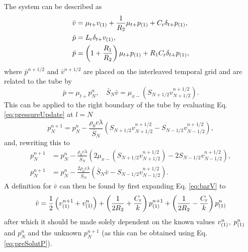 {The system can be described as
\begin{subequations}\label{eq:barVPSystem}
    \begin{align}
        \bar v &= \mu_{t+}v_{(1)} + \frac{1}{R_2}\mu_{t+}p_{(1)} + C_{\text{r}} \delta_{t+}p_{(1)},\label{eq:barV}\\
        \bar p &= L_{\text{r}} \delta_{t+}v_{(1)},\label{eq:barP1}\\
        \bar p &= \left(1+\frac{R_1}{R_2}\right)\mu_{t+}p_{(1)}+ R_1 C_{\text{r}}\delta_{t+}p_{(1)}\label{eq:barP2},
    \end{align}
\end{subequations}
where $\bar p^{n+1/2}$ and $\bar v^{n+1/2}$ are placed on the interleaved temporal grid and are related to the tube by
\begin{equation}\label{eq:barVars}
    \bar p = \mu_{t+}p^n_N, \quad \bar S_N \bar v = \mu_{x-}\left(S_{N+1/2}v_{N+1/2}^{n+1/2}\right).
\end{equation}
This can be applied to the right boundary of the tube by evaluating Eq. \eqref{eq:pressureUpdate} at $l = N$
\begin{equation}
    p_N^{n+1} = p_N^n - \frac{\rho_0 c \lambda}{\bar{S}_N}\left(S_{N+1/2}v_{N+1/2}^{n+1/2}-S_{N-1/2}v_{N-1/2}^{n+1/2}\right),
\end{equation}
and, rewriting this to 
\begin{align}
    p_N^{n+1} &= p_N^n - \frac{\rho_0 c \lambda}{\bar{S}_N}\left(2\mu_{x-}\left(S_{N+1/2}v_{N+1/2}^{n+1/2}\right)-2S_{N-1/2}v_{N-1/2}^{n+1/2}\right)\nonumber,\\
    p_N^{n+1} &= p_N^n - \frac{2\rho_0 c \lambda}{\bar{S}_N}\left(\bar S_N \bar v-S_{N-1/2}v_{N-1/2}^{n+1/2}\right)\label{eq:preSolutP}.
\end{align}
A definition for $\bar v$ can then be found by first expanding Eq. \eqref{eq:barV} to 
\begin{equation}\label{eq:vBarExpanded}
    \bar v = \frac{1}{2}\left(v_{(1)}^{n+1} + v_{(1)}^n\right) + \left(\frac{1}{2R_2} + \frac{C_{\text{r}}}{k}\right) p_{(1)}^{n+1} +\left(\frac{1}{2R_2} - \frac{C_{\text{r}}}{k}\right)p_{(1)}^n
\end{equation}
after which it should be made solely dependent on the known values $v_{(1)}^n$, $p_{(1)}^n$ and $p_N^n$ and the unknown $p_N^{n+1}$ (as this can be obtained using Eq. \eqref{eq:preSolutP}).

}
